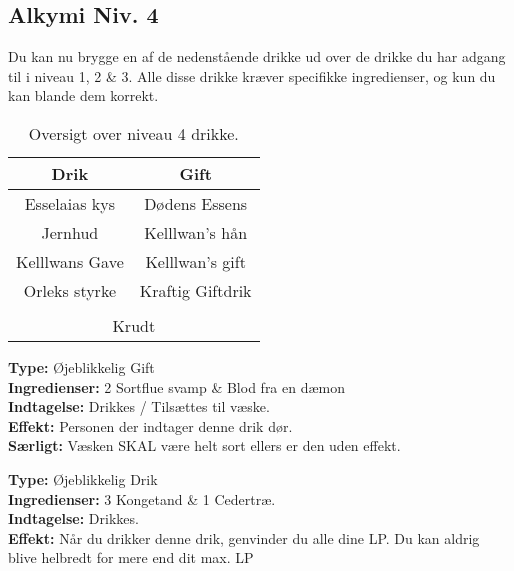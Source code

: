 \subsection*{Alkymi Niv. 4}
Du kan nu brygge en af de nedenstående drikke ud over de drikke du har adgang til i niveau 1, 2 \& 3. Alle disse drikke kræver specifikke ingredienser, og kun du kan blande dem korrekt.\\

\begin{table}[H]
    \centering
    \begin{tabular}{|c|c|}
        \rowcolor{cerulean!80}\hline
        Drik & Gift \\\hline
        Esselaias kys & Dødens Essens \\\hline
        Jernhud & Kelllwan’s hån \\\hline
        Kelllwans Gave & Kelllwan’s gift \\\hline
        Orleks styrke & Kraftig Giftdrik \\\hline
        \rowcolor{cerulean!80}\hline
        \multicolumn{2}{|c|}{Speciel} \\\hline
        \multicolumn{2}{|c|}{Krudt} \\\hline
    \end{tabular}
    \caption{Oversigt over niveau 4 drikke.}
\end{table}

\begin{gift*}
\textbf{Type:} Øjeblikkelig Gift\\
\textbf{Ingredienser:} 2 Sortflue svamp \& Blod fra en dæmon\\
\textbf{Indtagelse:} Drikkes / Tilsættes til væske.\\
\textbf{Effekt:} Personen der indtager denne drik dør.\\
\textbf{Særligt:} Væsken SKAL være helt sort ellers er den uden effekt.\\
\end{gift*}

\begin{drik*}
\textbf{Type:} Øjeblikkelig Drik\\
\textbf{Ingredienser:} 3 Kongetand \& 1 Cedertræ.\\
\textbf{Indtagelse:} Drikkes.\\
\textbf{Effekt:} Når du drikker denne drik, genvinder du alle dine LP.  Du kan aldrig blive helbredt for mere end dit max. LP
\end{drik*}

